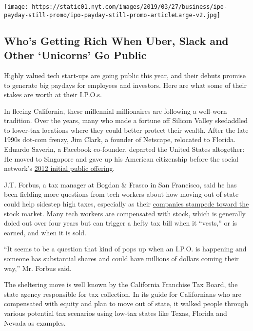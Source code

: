 \href{https://www.nytimes.com/interactive/2019/business/dealbook/ipo-investors.html}{}

\texttt{[image: https://static01.nyt.com/images/2019/03/27/business/ipo-payday-still-promo/ipo-payday-still-promo-articleLarge-v2.jpg]}

\hypertarget{whos-getting-rich-when-uber-slack-and-other-unicorns-go-public}{%
\subsection{Who's Getting Rich When Uber, Slack and Other `Unicorns' Go
Public}\label{whos-getting-rich-when-uber-slack-and-other-unicorns-go-public}}

Highly valued tech start-ups are going public this year, and their
debuts promise to generate big paydays for employees and investors. Here
are what some of their stakes are worth at their I.P.O.s.

In fleeing California, these millennial millionaires are following a
well-worn tradition. Over the years, many who made a fortune off Silicon
Valley skedaddled to lower-tax locations where they could better protect
their wealth. After the late 1990s dot-com frenzy, Jim Clark, a founder
of Netscape, relocated to Florida. Eduardo Saverin, a Facebook
co-founder, departed the United States altogether: He moved to Singapore
and gave up his American citizenship before the social network's
\href{https://dealbook.nytimes.com/2012/05/17/facebook-raises-16-billion-in-i-p-o/}{2012
initial public offering}.

J.T. Forbus, a tax manager at Bogdan \& Frasco in San Francisco, said he
has been fielding more questions from tech workers about how moving out
of state could help sidestep high taxes, especially as their
\href{https://www.nytimes.com/2019/04/18/technology/pinterest-stock.html}{companies
stampede toward the stock market}. Many tech workers are compensated
with stock, which is generally doled out over four years but can trigger
a hefty tax bill when it ``vests,'' or is earned, and when it is sold.

``It seems to be a question that kind of pops up when an I.P.O. is
happening and someone has substantial shares and could have millions of
dollars coming their way,'' Mr. Forbus said.

The sheltering move is well known by the California Franchise Tax Board,
the state agency responsible for tax collection. In its guide for
Californians who are compensated with equity and plan to move out of
state, it walked people through various potential tax scenarios using
low-tax states like Texas, Florida and Nevada as examples.

